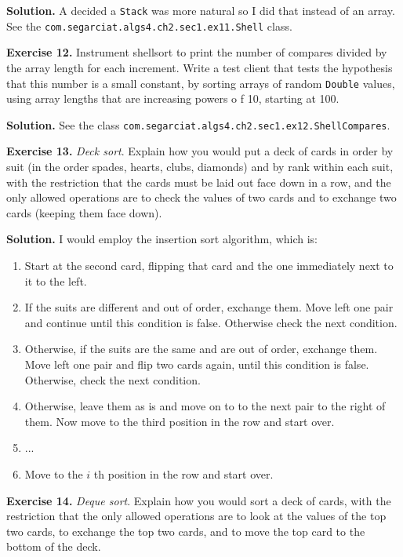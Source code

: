 \documentclass[12pt, a4paper]{article}
\newenvironment{ex}[2][Exercise]
{\par\medskip\noindent \textbf{#1 #2.}}
{\medskip}
\newenvironment{sol}[1][Solution]
{\par\medskip\noindent \textbf{#1.} }
{\medskip}
\begin{document}
	\begin{sol}
		A decided a \texttt{Stack} was more natural so I did that instead of an array.
		See the \texttt{com.segarciat.algs4.ch2.sec1.ex11.Shell} class.
	\end{sol}
	\begin{ex}{12}
		Instrument shellsort to print the number of compares divided by the array length for
		each increment. Write a test client that tests the hypothesis that this number is
		a small constant, by sorting arrays of random \texttt{Double} values, using array
		lengths that are increasing powers o f 10, starting at 100.
	\end{ex}
	\begin{sol}
		See the class \texttt{com.segarciat.algs4.ch2.sec1.ex12.ShellCompares}.
	\end{sol}
	\begin{ex}{13}
		\emph{Deck sort}. Explain how you would put a deck of cards in order by suit
		(in the order spades, hearts, clubs, diamonds) and by rank within each suit, with the
		restriction that the cards must be laid out face down in a row, and the only allowed
		operations are to check the values of two cards and to exchange two cards
		(keeping them face down).
	\end{ex}
	\begin{sol}
		I would employ the insertion sort algorithm, which is:
		\begin{enumerate}
			\item Start at the second card, flipping that card and the one immediately
			next to it to the left.
			\item If the suits are different and out of order, exchange them. Move left
			one pair and continue until this condition is false. Otherwise check the
			next condition.
			\item Otherwise, if the suits are the same and are out of order, exchange them.
			Move left one pair and flip two cards again, until this condition is false.
			Otherwise, check the next condition.
			\item Otherwise, leave them as is and move on to to the next pair to the right of them.
			Now move to the third position in the row and start over.
			\item ...
			\item Move to the $i$ th position in the row and start over.
		\end{enumerate}
	\end{sol}
	\begin{ex}{14}
		\emph{Deque sort}. Explain how you would sort a deck of cards, with the restriction that
		the only allowed operations are to look at the values of the top two cards, to exchange
		the top two cards, and to move the top card to the bottom of the deck.
	\end{ex}
\end{document}
